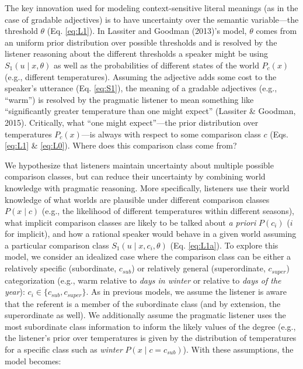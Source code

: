 \documentclass[doc]{apa6}
\begin{document}
The key innovation used for modeling context-sensitive literal meanings
(as in the case of gradable adjectives) is to have uncertainty over the
semantic variable---the threshold \(\theta\) (Eq. \ref{eq:L1}). In
Lassiter and Goodman (2013)'s model, \(\theta\) comes from an uniform
prior distribution over possible thresholds and is resolved by the
listener reasoning about the different thresholds a speaker might be
using \(S_{1}(u \mid x, \theta)\) as well as the probabilities of
different states of the world \(P_{c}(x)\) (e.g., different
temperatures). Assuming the adjective adds some cost to the speaker's
utterance (Eq. \ref{eq:S1}), the meaning of a gradable adjectives (e.g.,
``warm'') is resolved by the pragmatic listener to mean something
like ``significantly greater temperature than one might expect''
(Lassiter \& Goodman, 2015). Critically, what ``one might
expect''---the prior distribution over temperatures \(P_{c}(x)\)---is
always with respect to some comparison class \(c\) (Eqs. \ref{eq:L1} \&
\ref{eq:L0}). Where does this comparison class come from?

We hypothesize that listeners maintain uncertainty about multiple
possible comparison classes, but can reduce their uncertainty by
combining world knowledge with pragmatic reasoning. More specifically,
listeners use their world knowledge of what worlds are plausible under
different comparison classes \(P(x \mid c)\) (e.g., the likelihood of
different temperatures within different seasons), what implicit
comparison classes are likely to be talked about \emph{a priori}
\(P(c_i)\) (\(i\) for implicit), and how a rational speaker would behave
in a given world assuming a particular comparison class
\(S_{1}(u \mid x, c_i, \theta)\) (Eq. \ref{eq:L1a}). To explore this
model, we consider an idealized case where the comparison class can be
either a relatively specific (subordinate, \(c_{sub}\)) or relatively
general (superordinate, \(c_{super}\)) categorization (e.g., warm
relative to \emph{days in winter} or relative to \emph{days of the
year}): \(c_i \in \{c_{sub}, c_{super}\}\). As in previous models, we
assume the listener is aware that the referent is a member of the
subordinate class (and by extension, the superordinate as well). We
additionally assume the pragmatic listener uses the most subordinate
class information to inform the likely values of the degree (e.g., the
listener's prior over temperatures is given by the distribution of
temperatures for a specific class such as \emph{winter}
\(P(x \mid c = c_{sub})\)). With these assumptions, the model becomes:
\end{document}
